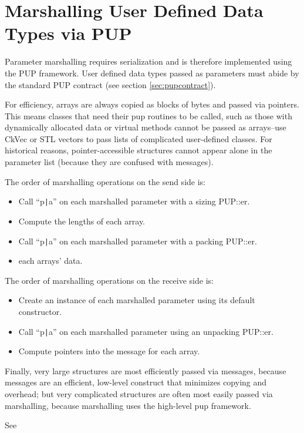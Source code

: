 \section{Marshalling User Defined Data Types via PUP}

Parameter marshalling requires serialization and is therefore
implemented using the PUP framework.  User defined data types passed
as parameters must abide by the standard PUP contract (see section
\ref{sec:pupcontract}).

For efficiency, arrays are always copied as blocks of bytes and passed
via pointers.  This means classes that need their pup routines to be
called, such as those with dynamically allocated data or virtual
methods cannot be passed as arrays--use CkVec or STL vectors to pass
lists of complicated user-defined classes.  For historical reasons,
pointer-accessible structures cannot appear alone in the parameter
list (because they are confused with messages).

The order of marshalling operations on the send side is:
\begin{itemize}
\item Call ``p\verb.|.a'' on each marshalled parameter with a sizing PUP::er.
\item Compute the lengths of each array.
\item Call ``p\verb.|.a'' on each marshalled parameter with a packing PUP::er.
\item {} each arrays' data.
\end{itemize}

The order of marshalling operations on the receive side is:
\begin{itemize}
\item Create an instance of each marshalled parameter using its default constructor.
\item Call ``p\verb.|.a'' on each marshalled parameter using an unpacking PUP::er.
\item Compute pointers into the message for each array.
\end{itemize}

Finally, very large structures are most efficiently passed via messages,
because messages are an efficient, low-level construct that minimizes copying
and overhead; but very complicated structures are often most easily passed via 
marshalling, because marshalling uses the high-level pup framework.

See 

